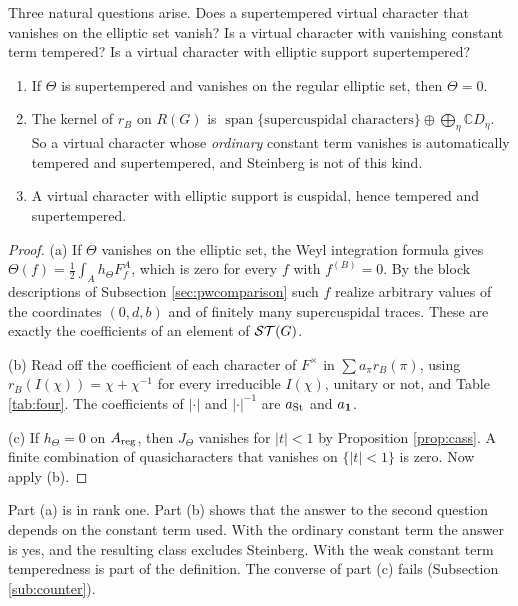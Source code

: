 Three natural questions arise. Does a supertempered virtual character that vanishes on the elliptic set vanish? Is a virtual character with vanishing constant term tempered? Is a virtual character with elliptic support supertempered?

\begin{corollary}\label{cor:three-questions}\begin{enumerate}[label=(\alph*),leftmargin=*]
\item If $\Theta$ is supertempered and vanishes on the regular elliptic set, then $\Theta=0$.
\item The kernel of $r_B$ on $R(G)$ is $\operatorname{span}\{\text{supercuspidal characters}\}\oplus\bigoplus_\eta\mathbb CD_\eta$. So a virtual character whose \emph{ordinary} constant term vanishes is automatically tempered and supertempered, and Steinberg is not of this kind.
\item A virtual character with elliptic support is cuspidal, hence tempered and supertempered.
\end{enumerate}
\end{corollary}
\begin{proof}
(a) If $\Theta$ vanishes on the elliptic set, the Weyl integration formula gives $\Theta(f)=\tfrac12\int_Ah_\Theta F_f^A$, which is zero for every $f$ with $f^{(B)}=0$. By the block descriptions of Subsection \ref{sec:pwcomparison} such $f$ realize arbitrary values of the coordinates $(0,d,b)$ and of finitely many supercuspidal traces. These are exactly the coefficients of an element of $\mathcal{ST}(G)$.

(b) Read off the coefficient of each character of $F^\times$ in $\sum a_\pi r_B(\pi)$, using $r_B(I(\chi))=\chi+\chi^{-1}$ for every irreducible $I(\chi)$, unitary or not, and Table \ref{tab:four}. The coefficients of $|\cdot|$ and $|\cdot|^{-1}$ are $a_{\operatorname{St}}$ and $a_{\mathbf 1}$.

(c) If $h_\Theta=0$ on $A_{\rm reg}$, then $J_\Theta$ vanishes for $|t|<1$ by Proposition \ref{prop:cass}. A finite combination of quasicharacters that vanishes on $\{|t|<1\}$ is zero. Now apply (b).
\end{proof}
Part (a) is \cite[Theorem 3.2]{He94} in rank one. Part (b) shows that the answer to the second question depends on the constant term used. With the ordinary constant term the answer is yes, and the resulting class excludes Steinberg. With the weak constant term temperedness is part of the definition. The converse of part (c) fails (Subsection \ref{sub:counter}).

